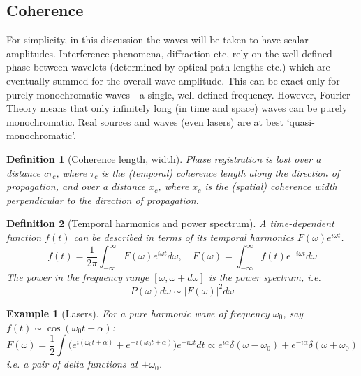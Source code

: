 \documentclass[a4paper]{article}
\newtheorem{eg}{Example}[section]
\theoremstyle{new}
\newtheorem{defi}{Definition}[section]
\begin{document}
\subsection{Coherence}
For simplicity, in this discussion the waves will be taken to have scalar
amplitudes. Interference phenomena, diffraction etc, rely on the well defined phase between wavelets (determined by optical path lengths etc.) which are eventually summed for the overall wave amplitude. This can be exact only for purely monochromatic waves - a single, well-defined frequency. However, Fourier Theory means that only infinitely long (in time and space) waves can be purely monochromatic. Real sources and waves (even lasers) are at best `quasi-monochromatic'.
\begin{defi}[Coherence length, width]
Phase registration is lost over a distance $c\tau_c$, where $\tau_c$ is the (temporal) coherence length along the direction of propagation, and over a distance $x_c$, where $x_c$ is the (spatial) coherence width perpendicular to the direction of propagation.
\end{defi}
\begin{defi}[Temporal harmonics and power spectrum]
A time-dependent function $f(t)$ can be described in terms of its temporal harmonics $F(\omega)e^{i\omega t}$.
$$f(t)=\frac{1}{2\pi}\int_{-\infty}^\infty F(\omega)e^{i\omega t}d\omega,\quad F(\omega)=\int_{-\infty}^\infty f(t)e^{-i\omega t}d\omega$$
The power in the frequency range $[\omega,\omega+d\omega]$ is the power spectrum, i.e.
$$P(\omega)d\omega\sim|F(\omega)|^2d\omega$$
\end{defi}
\begin{eg}[Lasers]
For a pure harmonic wave of frequency $\omega_0$, say $f(t)\sim\cos(\omega_0t+\alpha)$:
$$F(\omega)=\frac{1}{2}\int\bigg(e^{i(\omega_0t+\alpha)}+e^{-i(\omega_0t+\alpha)}\bigg)e^{-i\omega t}dt\propto e^{i\alpha}\delta(\omega-\omega_0)+e^{-i\alpha}\delta(\omega+\omega_0)$$
i.e. a pair of delta functions at $\pm\omega_0$.
\end{eg}
\end{document}
